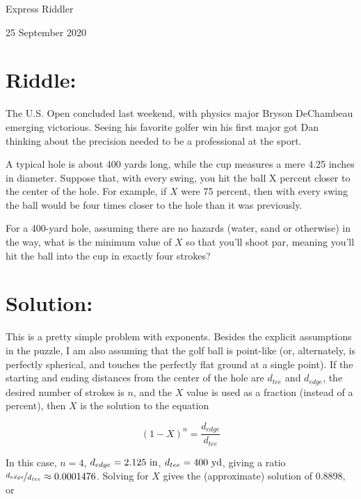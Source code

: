 \documentclass{article}
\begin{document}
\pagestyle{empty} %

\begin{center}
{\LARGE Express Riddler}

\vspace{0.15in}

{\Large 25 September 2020}
\end{center}


\section*{Riddle:}

The U.S. Open concluded last weekend, with physics major Bryson DeChambeau emerging victorious.
Seeing his favorite golfer win his first major got Dan thinking about the precision needed to be a professional at the sport.

A typical hole is about 400 yards long, while the cup measures a mere 4.25 inches in diameter.
Suppose that, with every swing, you hit the ball X percent closer to the center of the hole.
For example, if $X$ were 75 percent, then with every swing the ball would be four times closer to the hole than it was previously.

For a 400-yard hole, assuming there are no hazards (water, sand or otherwise) in the way, what is the minimum value of $X$ so that you'll shoot par, meaning you'll hit the ball into the cup in exactly four strokes?

\section*{Solution:}

This is a pretty simple problem with exponents.
Besides the explicit assumptions in the puzzle, I am also assuming that the golf ball is point-like (or, alternately, is perfectly spherical, and touches the perfectly flat ground at a single point).
If the starting and ending distances from the center of the hole are $d_{tee}$ and $d_{edge}$, the desired number of strokes is $n$, and the $X$ value is used as a fraction (instead of a percent), then $X$ is the solution to the equation

\[
(1-X)^{n}=\frac{d_{edge}}{d_{tee}}
\]

In this case, $n=4$, $d_{edge}=2.125\ \rm{in}$, $d_{tee}=400\ \rm{yd}$, giving a ratio $\nicefrac{d_{edge}}{d_{tee}}\approx0.0001476$.
Solving for $X$ gives the (approximate) solution of 0.8898, or
\end{document}
